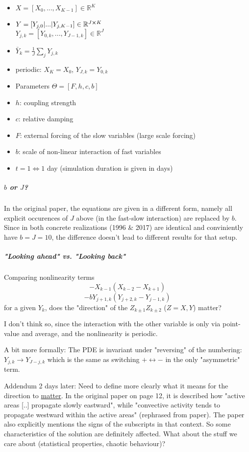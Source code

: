 \documentclass[11pt]{article}
\newcommand{\R}{{\mathbb{R}}}
\begin{document}
\begin{itemize}
\item \(X = [X_0, ..., X_{K-1}] \in \R^K\)
\item \(Y = [Y_{j, 0} | ... | Y_{j, K-1}] \in \R^{J \cross K}\) \\
\(Y_{j,k} = [Y_{0,k}, ..., Y_{J-1,k}] \in  \R^J\)
\item \(\bar{Y}_k = \frac{1}{J}\sum_j Y_{j,k}\)
\item periodic: \(X_K = X_0\), \(Y_{J,k} = Y_{0,k}\)
\item Parameters \(\Theta = [F, h, c, b]\)
\item \(h\): coupling strength
\item \(c\): relative damping
\item \(F\): external forcing of the slow variables (large scale forcing)
\item \(b\): scale of non-linear interaction of fast variables
\item \(t = 1 \Leftrightarrow 1\) day (simulation duration is given in days)
\end{itemize}

\subparagraph{\(b\) or \(J\)?}
\label{sec:org2a05413}
In the original paper, the equations are given in a different form, namely all
explicit occurences of \(J\) above (in the fast-slow interaction) are replaced by
\(b\). Since in both concrete realizations (1996 \& 2017) are identical and conviniently
have \(b=J=10\), the difference doesn't lead to different results for that setup.

\subparagraph{"Looking ahead" vs. "Looking back"}
\label{sec:orgefd65e2}
Comparing nonlinearity terms
$$-X_{k-1}(X_{k-2} - X_{k+1})$$
$$-bY_{j+1,k}(Y_{j+2,k} - Y_{j-1, k})$$
for a given \(Y_{k}\), does the "direction" of the \(Z_{k\pm 1}Z_{k\pm 2}\) (\(Z=X,Y\)) matter?

I don't think so, since the interaction with the other variable is only via point-value
and average, and the nonlinearity is periodic.

A bit more formally:
The PDE is invariant under "reversing" of the numbering:
\(Y_{j,k} \rightarrow Y_{J-j,k}\) which is the same as switching \(+ \leftrightarrow -\) in
the only "asymmetric" term.

Addendum 2 days later: Need to define more clearly what it means for the direction to
\uline{matter}. In the original paper on page 12, it is described how "active areas [..] propagate
slowly eastward", while "convective activity tends to propagate westward within the active
areas" (rephrased from paper). The paper also explicitly mentions the signs of the subscripts
in that context. So some characteristics of the solution are definitely affected.
What about the stuff we care about (statistical properties, chaotic behaviour)?
\end{document}
